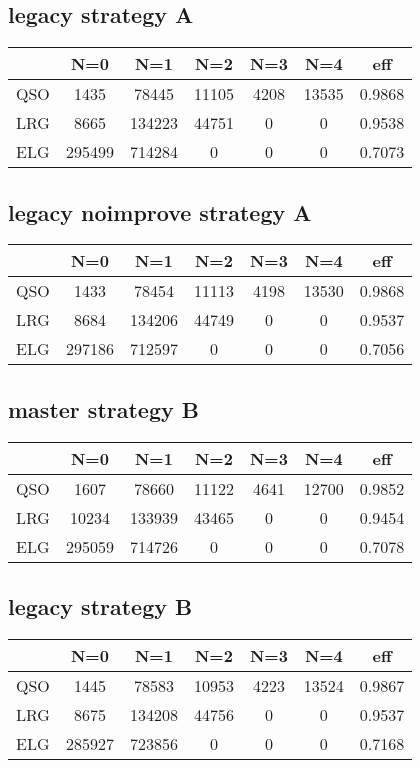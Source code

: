 \documentclass{article}
\begin{document}
\subsection*{legacy strategy A}
\begin{center}
\begin{tabular}{l|ccccc|c}
 & N=0 & N=1 & N=2 & N=3 & N=4 & eff\\\hline
QSO & 1435& 78445& 11105& 4208& 13535 &  0.9868\\
LRG & 8665& 134223& 44751& 0& 0& 0.9538\\
ELG & 295499& 714284& 0& 0& 0 & 0.7073\\
\end{tabular}
\end{center}

\subsection*{legacy noimprove strategy A}
\begin{center}
\begin{tabular}{l|ccccc|c}
 & N=0 & N=1 & N=2 & N=3 & N=4 & eff\\\hline
QSO & 1433 &  78454 &  11113 &  4198 &  13530 &  0.9868\\
LRG & 8684 &  134206 &  44749 &  0 &  0 &  0.9537\\
ELG & 297186 &  712597 &  0 &  0 &  0 &  0.7056\\
\end{tabular}
\end{center}

\subsection*{master strategy B}
\begin{center}
\begin{tabular}{l|ccccc|c}
 & N=0 & N=1 & N=2 & N=3 & N=4 & eff\\\hline
QSO &  1607 &  78660 &  11122 &  4641 &  12700 &  0.9852\\
LRG &  10234 &  133939 &  43465 &  0 &  0 &  0.9454\\
ELG &  295059 &  714726 &  0 &  0 &  0 &  0.7078\\
\end{tabular}
\end{center}

\subsection*{legacy strategy B}
\begin{center}
\begin{tabular}{l|ccccc|c}
 & N=0 & N=1 & N=2 & N=3 & N=4 & eff\\\hline
QSO & 1445 &  78583 &  10953 &  4223 &  13524 &  0.9867\\
LRG & 8675 &  134208 &  44756 &  0 &  0 &  0.9537\\
ELG & 285927 &  723856 &  0 &  0 &  0 &  0.7168\\
\end{tabular}
\end{center}
\end{document}

